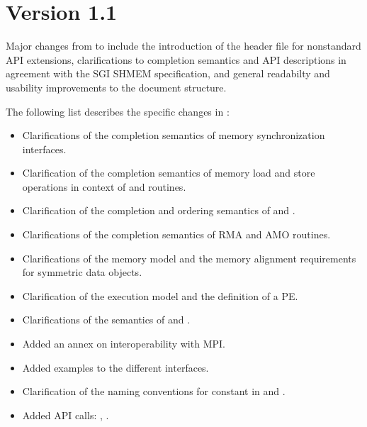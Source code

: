 \section{Version 1.1}
Major changes from \openshmem[1.0] to \openshmem[1.1] include
the introduction of the  header file for nonstandard \ac{API}
extensions,
clarifications to completion semantics and \ac{API} descriptions in agreement with
the \ac{SGI} SHMEM specification,
and general readabilty and usability improvements to the document structure.

The following list describes the specific changes in \openshmem[1.1]:
\begin{itemize}
%
\item Clarifications of the completion semantics of memory synchronization
      interfaces.
%
%
\item Clarification of the completion semantics of memory load and store
      operations in context of  and 
      routines.
%
%
\item Clarification of the completion and ordering semantics of
       and .
%
%
\item Clarifications of the completion semantics of \ac{RMA} and \ac{AMO}
      routines.
%
%
\item Clarifications of the memory model and the memory alignment requirements
      for symmetric data objects.
%
%
\item Clarification of the execution model and the definition of a \ac{PE}.
%
%
\item Clarifications of the semantics of  and
      .
%
%
\item Added an annex on interoperability with \ac{MPI}.
%
%
\item Added examples to the different interfaces.
%
\item Clarification of the naming conventions for constant in \Cstd and
      \Fortran.
%
%
\item Added \ac{API} calls: , .

\end{itemize}
